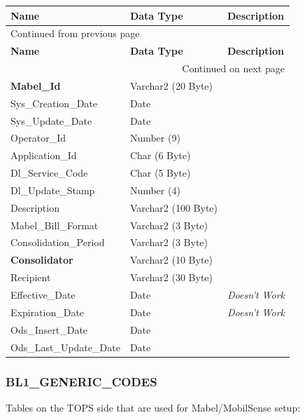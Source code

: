 \documentclass[12pt,twoside]{article}
\begin{document}
\begin{longtable}{l|l|l}
\hline
\textbf{Name} & \textbf{Data Type} & \textbf{Description}\\
\hline
\endfirsthead
\multicolumn{3}{l}{Continued from previous page} \\
\hline

\textbf{Name} & \textbf{Data Type} & \textbf{Description} \\

\hline
\endhead
\hline\multicolumn{3}{r}{Continued on next page} \\
\endfoot
\endlastfoot
\hline
\textbf{Mabel\_Id} & Varchar2 (20 Byte) & \\
Sys\_Creation\_Date & Date & \\
Sys\_Update\_Date & Date & \\
Operator\_Id & Number (9) & \\
Application\_Id & Char (6 Byte) & \\
Dl\_Service\_Code & Char (5 Byte) & \\
Dl\_Update\_Stamp & Number (4) & \\
Description & Varchar2 (100 Byte) & \\
Mabel\_Bill\_Format & Varchar2 (3 Byte) & \\
Consolidation\_Period & Varchar2 (3 Byte) & \\
\textbf{Consolidator} & Varchar2 (10 Byte) & \\
Recipient & Varchar2 (30 Byte) & \\
Effective\_Date & Date & \emph{Doesn't Work}\\
Expiration\_Date & Date & \emph{Doesn't Work}\\
Ods\_Insert\_Date & Date & \\
Ods\_Last\_Update\_Date & Date & \\
\hline
\end{longtable}
\normalsize
\subsubsection{BL1\_GENERIC\_CODES}
\label{sec:orgheadline149}
Tables on the TOPS side that are used for Mabel/MobilSense setup:
\footnotesize
\end{document}
